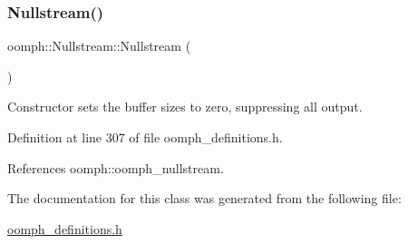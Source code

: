 \subsubsection{\texorpdfstring{Nullstream()}{Nullstream()}}
{\footnotesize\ttfamily oomph\+::\+Nullstream\+::\+Nullstream (\begin{DoxyParamCaption}{ }\end{DoxyParamCaption})\hspace{0.3cm}{\ttfamily [inline]}}



Constructor sets the buffer sizes to zero, suppressing all output. 



Definition at line 307 of file oomph\+\_\+definitions.\+h.



References oomph\+::oomph\+\_\+nullstream.



The documentation for this class was generated from the following file\+:\begin{DoxyCompactItemize}
\item 
\hyperlink{oomph__definitions_8h}{oomph\+\_\+definitions.\+h}\end{DoxyCompactItemize}
